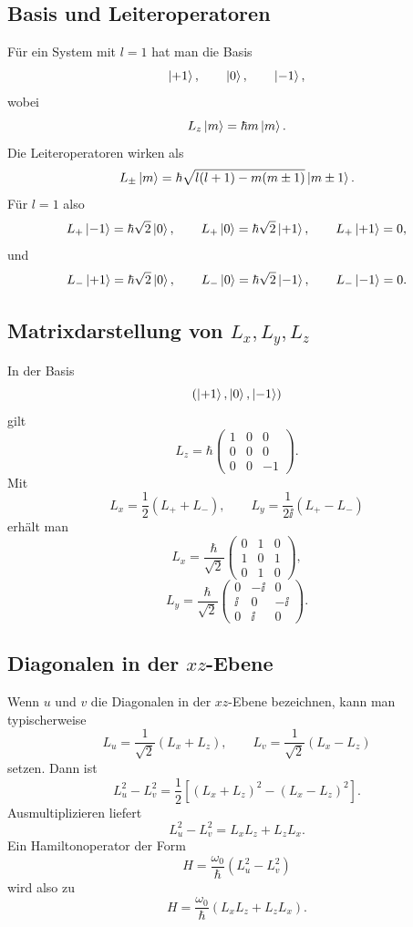 \subsection{Basis und Leiteroperatoren}

Für ein System mit \(l=1\) hat man die Basis
\[
    \left|+1\right\rangle,
    \qquad
    \left|0\right\rangle,
    \qquad
    \left|-1\right\rangle,
\]
wobei
\[
    L_z\left|m\right\rangle=\hbar m\left|m\right\rangle.
\]
Die Leiteroperatoren wirken als
\[
    L_\pm\left|m\right\rangle=\hbar\sqrt{l(l+1)-m(m\pm1)}\left|m\pm1\right\rangle.
\]
Für \(l=1\) also
\[
    L_+\left|-1\right\rangle=\hbar\sqrt2\left|0\right\rangle,
    \qquad
    L_+\left|0\right\rangle=\hbar\sqrt2\left|+1\right\rangle,
    \qquad
    L_+\left|+1\right\rangle=0,
\]
und
\[
    L_-\left|+1\right\rangle=\hbar\sqrt2\left|0\right\rangle,
    \qquad
    L_-\left|0\right\rangle=\hbar\sqrt2\left|-1\right\rangle,
    \qquad
    L_-\left|-1\right\rangle=0.
\]

\subsection{Matrixdarstellung von \texorpdfstring{\(L_x,L_y,L_z\)}{Lx,Ly,Lz}}

In der Basis
\[
    (\left|+1\right\rangle,\left|0\right\rangle,\left|-1\right\rangle)
\]
gilt
\[
    L_z=\hbar
    \begin{pmatrix}
        1&0&0\\
        0&0&0\\
        0&0&-1
    \end{pmatrix}.
\]
Mit
\[
    L_x=\frac12(L_++L_-),
    \qquad
    L_y=\frac{1}{2\ii}(L_+-L_-)
\]
erhält man
\[
    L_x=\frac{\hbar}{\sqrt2}
    \begin{pmatrix}
        0&1&0\\
        1&0&1\\
        0&1&0
    \end{pmatrix},
\]
\[
    L_y=\frac{\hbar}{\sqrt2}
    \begin{pmatrix}
        0&-\ii&0\\
        \ii&0&-\ii\\
        0&\ii&0
    \end{pmatrix}.
\]

\subsection{Diagonalen in der \texorpdfstring{\(xz\)}{xz}-Ebene}

Wenn \(u\) und \(v\) die Diagonalen in der \(xz\)-Ebene bezeichnen, kann man typischerweise
\[
    L_u=\frac{1}{\sqrt2}(L_x+L_z),
    \qquad
    L_v=\frac{1}{\sqrt2}(L_x-L_z)
\]
setzen. Dann ist
\[
    L_u^2-L_v^2
    =\frac12\left[(L_x+L_z)^2-(L_x-L_z)^2\right].
\]
Ausmultiplizieren liefert
\[
    L_u^2-L_v^2
    =L_xL_z+L_zL_x.
\]
Ein Hamiltonoperator der Form
\[
    H=\frac{\omega_0}{\hbar}(L_u^2-L_v^2)
\]
wird also zu
\[
    H=\frac{\omega_0}{\hbar}(L_xL_z+L_zL_x).
\]

